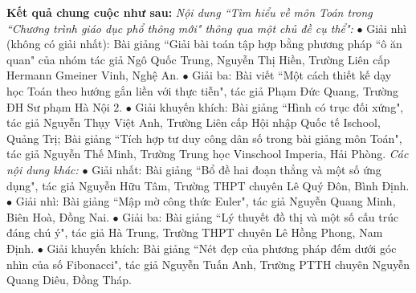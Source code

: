 \begin{multicols}{2}
	\vskip 0.1cm
	\textbf{\color{diendantoanhoc}Kết quả chung cuộc như sau:}
	\vskip 0.1cm
	\textit{Nội dung ``Tìm hiểu về môn Toán trong ``Chương trình giáo dục phổ thông mới" thông qua một chủ đề cụ thể": }
	\vskip 0.1cm
	$\bullet$	Giải nhì (không có giải nhất): Bài giảng ``Giải bài toán tập hợp bằng phương pháp ``ô ăn quan" của nhóm tác giả Ngô Quốc Trung, Nguyễn Thị Hiền, Trường Liên cấp Hermann Gmeiner Vinh, Nghệ An. 
	\vskip 0.1cm
	$\bullet$	Giải ba: Bài viết ``Một cách thiết kế dạy học Toán theo hướng gắn liền với thực tiễn", tác giả Phạm Đức Quang, Trường ĐH Sư phạm Hà Nội $2$.
	\vskip 0.1cm 
	$\bullet$	Giải khuyến khích: Bài giảng ``Hình có trục đối xứng", tác giả Nguyễn Thụy Việt Anh, Trường Liên cấp Hội nhập Quốc tế Ischool, Quảng Trị; Bài giảng ``Tích hợp tư duy công dân số trong bài giảng môn Toán", tác giả Nguyễn Thế Minh, Trường Trung học Vinschool Imperia, Hải Phòng.
	\vskip 0.1cm
	\textit{Các nội dung khác:}
	\vskip 0.1cm 
	$\bullet$	Giải nhất: Bài giảng ``Bổ đề hai đoạn thẳng và một số ứng dụng", tác giả Nguyễn Hữu Tâm, Trường THPT chuyên Lê Quý Đôn, Bình Định. 
	\vskip 0.1cm
	$\bullet$	Giải nhì: Bài giảng ``Mập mờ công thức Euler", tác giả Nguyễn Quang Minh, Biên Hoà, Đồng Nai. 
	\vskip 0.1cm
	$\bullet$	Giải ba: Bài giảng ``Lý thuyết đồ thị và một số cấu trúc đáng chú ý", tác giả Hà Trung, Trường THPT chuyên Lê Hồng Phong, Nam Định. 
	\vskip 0.1cm
	$\bullet$	Giải khuyến khích: Bài giảng ``Nét đẹp của phương pháp đếm dưới góc nhìn của số Fibonacci", tác giả Nguyễn Tuấn Anh, Trường PTTH chuyên Nguyễn Quang Diêu, Đồng Tháp. 
\end{multicols}